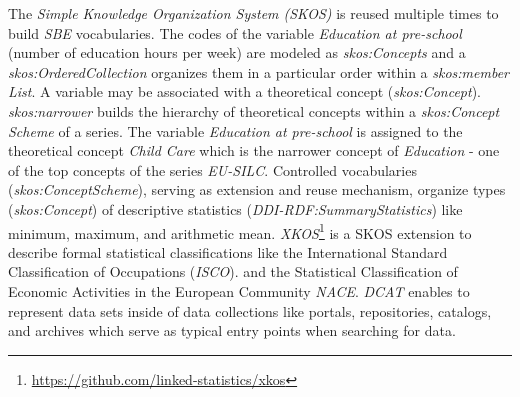 \documentclass[conference]{IEEEtran}
\begin{document}
The \emph{Simple Knowledge Organization System (SKOS)} is reused multiple times to build \emph{SBE} vocabularies.
The codes of the variable \emph{Education at pre-school} (number of education hours per week) are modeled as \emph{skos:Concepts} and 
a \emph{skos:OrderedCollection} organizes them in a particular order within a \emph{skos:member} \emph{List}.
A variable may be associated with a theoretical concept (\emph{skos:Concept}). 
\emph{skos:narrower} builds the hierarchy of theoretical concepts within a \emph{skos:Concept} \emph{Scheme} of a series.
The variable \emph{Education at pre-school} is assigned to the theoretical concept \emph{Child Care} which is the narrower concept of \emph{Education} - one of the top concepts of the series \emph{EU-SILC}.
Controlled vocabularies (\emph{skos:ConceptScheme}), serving as extension and reuse mechanism,
organize types (\emph{skos:Concept}) of descriptive statistics (\emph{DDI-RDF:SummaryStatistics}) like minimum, maximum, and arithmetic mean.
\emph{XKOS}\footnote{\url{https://github.com/linked-statistics/xkos}} is a SKOS extension to describe formal statistical classifications like the International Standard Classification of Occupations (\emph{ISCO}). 
and the Statistical Classification of Economic Activities in the European Community \emph{NACE}.
\emph{DCAT} enables to represent data sets inside of data collections like portals, repositories, catalogs, and archives
which serve as typical entry points when searching for data.

\end{document}
